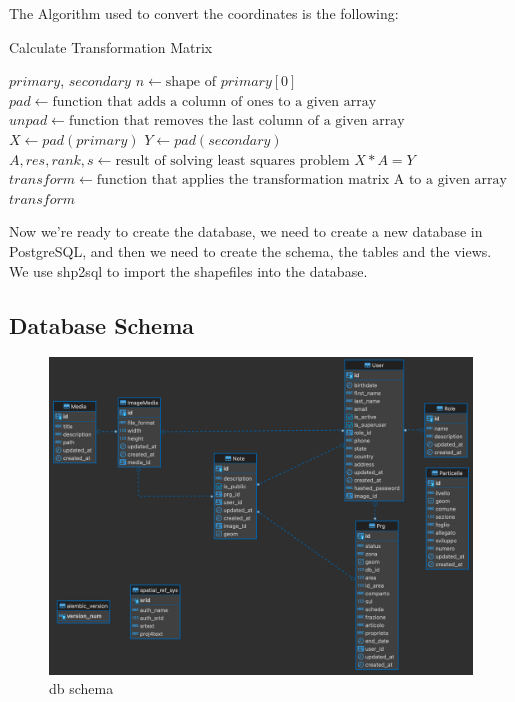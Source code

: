 The Algorithm used to convert the coordinates is the following:
\begin{algorithm}[H]
    \caption{Calculate Transformation Matrix}
    \begin{algorithmic}[1]
        \REQUIRE $primary$, $secondary$
        \STATE $n \gets \text{shape of } primary[0]$
        \STATE $pad \gets \text{function that adds a column of ones to a given array}$
        \STATE $unpad \gets \text{function that removes the last column of a given array}$
        \STATE $X \gets pad(primary)$
        \STATE $Y \gets pad(secondary)$
        \STATE $A, res, rank, s \gets \text{result of solving least squares problem } X * A = Y$
        \STATE $transform \gets \text{function that applies the transformation matrix A to a given array}$
        \RETURN $transform$
    \end{algorithmic}
\end{algorithm}

Now we're ready to create the database, we need to create a new database in PostgreSQL, and then we need to create the schema, the tables and the views.
We use shp2sql to import the shapefiles into the database.

\subsection{Database Schema}\label{subsec:database-schema}
\begin{figure}[H]
    \includegraphics[width=\textwidth]{res/db_schema}
    \caption{db schema}
    \label{fig:dbschema}
\end{figure}

